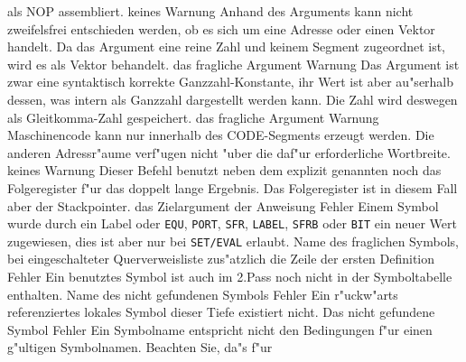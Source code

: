 \documentclass[12pt,a4paper,twoside]{report}
\newcommand{\tty}[1]{{\tt #1}}
\begin{document}
\begin{description}
{                als NOP assembliert.}
               {keines}
               {Warnung}
               {Anhand des Arguments kann nicht zweifelsfrei entschieden werden, ob
                es sich um eine Adresse oder einen Vektor handelt.  Da das Argument eine
                reine Zahl und keinem Segment zugeordnet ist, wird es als Vektor behandelt.}
               {das fragliche Argument}
               {Warnung}
               {Das Argument ist zwar eine syntaktisch korrekte Ganzzahl-Konstante, ihr
                Wert ist aber au"serhalb dessen, was intern als Ganzzahl dargestellt
                werden kann.  Die Zahl wird deswegen als Gleitkomma-Zahl gespeichert.}
               {das fragliche Argument}
               {Warnung}
               {Maschinencode kann nur innerhalb des CODE-Segments erzeugt werden. Die
                anderen Adressr"aume verf"ugen nicht "uber die daf"ur erforderliche
                Wortbreite.}
               {keines}
               {Warnung}
               {Dieser Befehl benutzt neben dem explizit genannten
                noch das Folgeregister f"ur das doppelt lange Ergebnis.
                Das Folgeregister ist in diesem Fall aber der
                Stackpointer.}
               {das Zielargument der Anweisung}
               {Fehler}
               {Einem Symbol wurde durch ein Label oder
	        \tty{EQU}, \tty{PORT}, \tty{SFR}, \tty{LABEL},
	        \tty{SFRB} oder \tty{BIT} ein neuer  Wert zugewiesen, dies
                ist aber nur bei \tty{SET/EVAL} erlaubt.}
               {Name des fraglichen Symbols, bei eingeschalteter
	        Querverweisliste zus"atzlich die Zeile der ersten Definition}
               {Fehler}
               {Ein benutztes Symbol ist auch im 2.Pass noch
                nicht in der Symboltabelle enthalten.}
               {Name des nicht gefundenen Symbols}
               {Fehler}
               {Ein r"uckw"arts referenziertes lokales Symbol
                dieser Tiefe existiert nicht.}
               {Das nicht gefundene Symbol}
               {Fehler}
               {Ein Symbolname entspricht nicht den Bedingungen
                f"ur einen g"ultigen Symbolnamen.  Beachten Sie, da"s f"ur
}
\end{description}
\end{document}

